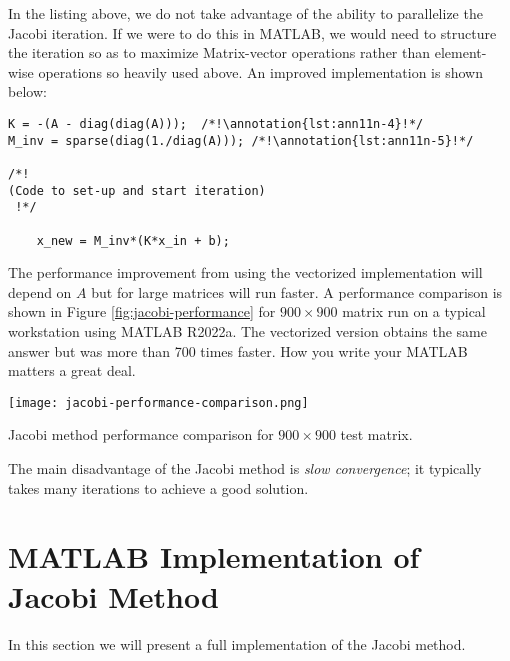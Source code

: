 In the listing above, we do not take advantage of the ability to parallelize the Jacobi iteration.  If we were to do this in MATLAB, we would need to structure the iteration so as to maximize Matrix-vector operations rather than element-wise operations so heavily used above.  An improved implementation is shown below:
\begin{lstlisting}[style=myMatlab]
K = -(A - diag(diag(A)));  /*!\annotation{lst:ann11n-4}!*/
M_inv = sparse(diag(1./diag(A))); /*!\annotation{lst:ann11n-5}!*/

/*! 
(Code to set-up and start iteration)
 !*/

    x_new = M_inv*(K*x_in + b);

\end{lstlisting}
The performance improvement from using the vectorized implementation will depend on $A$ but for large matrices will run faster.  A performance comparison is shown in Figure \ref{fig:jacobi-performance} for $900 \times 900$ matrix run on a typical workstation using MATLAB R2022a.  The vectorized version obtains the same answer but was more than 700 times faster.  How you write your MATLAB matters a great deal.
\begin{marginfigure}
\texttt{[image: jacobi-performance-comparison.png]}
\caption{Jacobi method performance comparison for $900 \times 900$ test matrix.}
\label{fig:jacobi-performance}
\end{marginfigure}

The main disadvantage of the Jacobi method is \emph{slow convergence}; it typically takes many iterations to achieve a good solution.

\section{MATLAB Implementation of Jacobi Method}
In this section we will present a full implementation of the Jacobi method.

